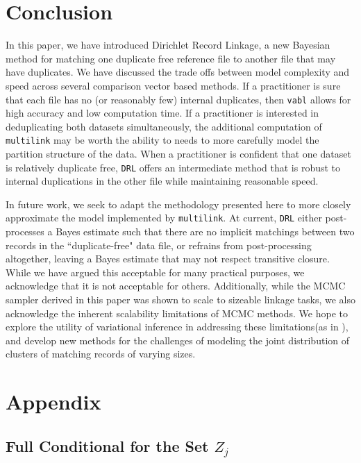 \documentclass[12pt,letterpaper]{article}
\newcommand{\1}[1]{\mathbb{I}\!\left[#1\right]} %
\begin{document}
\section{Conclusion}\label{sec:conclusion}

In this paper, we have introduced Dirichlet Record Linkage, a new Bayesian method for matching one duplicate free reference file to another file that may have duplicates. We have discussed the trade offs between model complexity and speed across several comparison vector based methods. If a practitioner is sure that each file has no (or reasonably few) internal duplicates, then \texttt{vabl} allows for high accuracy and low computation time. If a practitioner is interested in deduplicating both datasets simultaneously, the additional computation of \texttt{multilink} may be worth the ability to needs to more carefully model the partition structure of the data. When a practitioner is confident that one dataset is relatively duplicate free, \texttt{DRL} offers an intermediate method that is robust to internal duplications in the other file while maintaining reasonable speed. 

In future work, we seek to adapt the methodology presented here to more closely approximate the model implemented by \texttt{multilink}. At current, \texttt{DRL} either post-processes a Bayes estimate such that there are no implicit matchings between two records in the ``duplicate-free" data file, or refrains from post-processing altogether, leaving a Bayes estimate that may not respect transitive closure. While we have argued this acceptable for many practical purposes, we acknowledge that it is not acceptable for others. Additionally, while the MCMC sampler derived in this paper was shown to scale to sizeable linkage tasks, we also acknowledge the inherent scalability limitations of MCMC methods. We hope to explore the utility of variational inference in addressing these limitations(as in \cite{kundinger_2024_vabl}), and develop new methods for the challenges of modeling the joint distribution of clusters of matching records of varying sizes. 

\pagebreak



\pagebreak

\section{Appendix}
\label{sec:appendix}

\subsection{Full Conditional for the Set $Z_j$}\label{app:joint-distribution}
\end{document}
